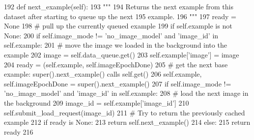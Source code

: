 \begin{DoxyCode}
192     \textcolor{keyword}{def }next\_example(self):
193         \textcolor{stringliteral}{"""}
194 \textcolor{stringliteral}{        Returns the next example from this dataset after starting to queue up the next}
195 \textcolor{stringliteral}{        example.}
196 \textcolor{stringliteral}{        """}
197         ready = \textcolor{keywordtype}{None}
198         \textcolor{comment}{# pull up the currently queued example}
199         \textcolor{keywordflow}{if} self.example \textcolor{keywordflow}{is} \textcolor{keywordflow}{not} \textcolor{keywordtype}{None}:
200             \textcolor{keywordflow}{if} self.image\_mode != \textcolor{stringliteral}{'no\_image\_model'} \textcolor{keywordflow}{and} \textcolor{stringliteral}{'image\_id'} \textcolor{keywordflow}{in} self.example:
201                 \textcolor{comment}{# move the image we loaded in the background into the example}
202                 image = self.data\_queue.get()
203                 self.example[\textcolor{stringliteral}{'image'}] = image
204             ready = (self.example, self.imageEpochDone)
205         \textcolor{comment}{# get the next base example: super().next\_example() calls self.get()}
206         self.example, self.imageEpochDone = super().next\_example()
207         \textcolor{keywordflow}{if} self.image\_mode != \textcolor{stringliteral}{'no\_image\_model'} \textcolor{keywordflow}{and} \textcolor{stringliteral}{'image\_id'} \textcolor{keywordflow}{in} self.example:
208             \textcolor{comment}{# load the next image in the background}
209             image\_id = self.example[\textcolor{stringliteral}{'image\_id'}]
210             self.submit\_load\_request(image\_id)
211         \textcolor{comment}{# Try to return the previously cached example}
212         \textcolor{keywordflow}{if} ready \textcolor{keywordflow}{is} \textcolor{keywordtype}{None}:
213             \textcolor{keywordflow}{return} self.next\_example()
214         \textcolor{keywordflow}{else}:
215             \textcolor{keywordflow}{return} ready
216 
\end{DoxyCode}
\mbox{\label{classparlai_1_1tasks_1_1flickr30k_1_1agents_1_1DefaultTeacher_a0711151a8588c499abdda943b27793a8}} 

